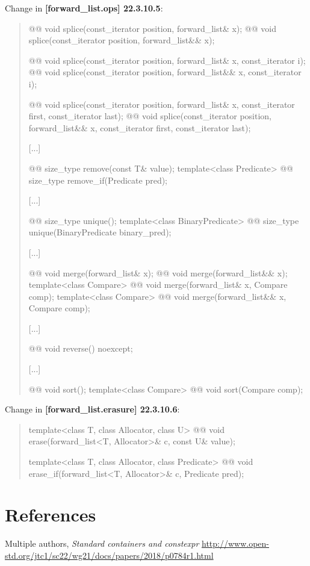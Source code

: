 \documentclass{wg21}
\begin{document}
Change in \textbf{[forward_list.ops] 22.3.10.5}:
\begin{quote}
\begin{itemdecl}
@@ void splice(const_iterator position, forward_list& x);
@@ void splice(const_iterator position, forward_list&& x);

@@ void splice(const_iterator position, forward_list& x, const_iterator i);
@@ void splice(const_iterator position, forward_list&& x, const_iterator i);

@@ void splice(const_iterator position, forward_list& x, const_iterator first,
const_iterator last);
@@ void splice(const_iterator position, forward_list&& x, const_iterator first,
const_iterator last);
\end{itemdecl}
[...]
\begin{itemdecl}
@@ size_type remove(const T& value);
template<class Predicate> @@ size_type remove_if(Predicate pred);
\end{itemdecl}
[...]
\begin{itemdecl}
@@ size_type unique();
template<class BinaryPredicate> @@ size_type unique(BinaryPredicate binary_pred);
\end{itemdecl}
[...]
\begin{itemdecl}
@@ void merge(forward_list& x);
@@ void merge(forward_list&& x);
template<class Compare> @@ void merge(forward_list& x, Compare comp);
template<class Compare> @@ void merge(forward_list&& x, Compare comp);
\end{itemdecl}
[...]
\begin{itemdecl}
@@ void reverse() noexcept;
\end{itemdecl}
[...]
\begin{itemdecl}
@@ void sort();
template<class Compare> @@ void sort(Compare comp);
\end{itemdecl}
\end{quote}

Change in \textbf{[forward_list.erasure] 22.3.10.6}:
\begin{quote}
\begin{itemdecl}
template<class T, class Allocator, class U>
  @@ void erase(forward_list<T, Allocator>& c, const U& value);
  
template<class T, class Allocator, class Predicate>
  @@ void erase_if(forward_list<T, Allocator>& c, Predicate pred);  
\end{itemdecl}
\end{quote}


\section{References}
\renewcommand{\section}[2]{}%
\begin{thebibliography}{9}

  Multiple authors,
  \emph{Standard containers and constexpr}\newline
  \url{http://www.open-std.org/jtc1/sc22/wg21/docs/papers/2018/p0784r1.html}

\end{thebibliography}
\end{document}
